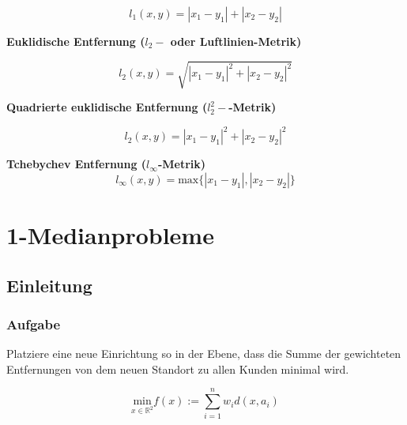     \begin{equation}
      l_1(x, y) = |x_1 - y_1| + |x_2 - y_2|
    \end{equation}

    \par \textbf{Euklidische Entfernung ($l_2-$ oder Luftlinien-Metrik)}

    \begin{equation}
      l_2(x, y) = \sqrt{|x_1 - y_1| ^ 2 + |x_2 - y_2| ^ 2}
    \end{equation}

    \par \textbf{Quadrierte euklidische Entfernung ($l_2^2-$-Metrik)}

    \begin{equation}
      l_2(x, y) = |x_1 - y_1| ^ 2 + |x_2 - y_2| ^ 2
    \end{equation}


    \par \textbf{Tchebychev Entfernung ($l_\infty$-Metrik)}
    \begin{equation}
      l_{\infty}(x, y) = \text{max}\{\left|x_1 - y_1\right|, \left|x_2 - y_2\right|\}
    \end{equation}
    


  \section{1-Medianprobleme} %
  \label{sec:1_medianprobleme}

    \subsection{Einleitung} %
    \label{sub:einleitung}

      \subsubsection{Aufgabe} %
      \label{ssub:aufgabe}
    
      \par Platziere eine neue Einrichtung so in der Ebene, dass die Summe der gewichteten Entfernungen von dem neuen Standort zu allen Kunden minimal wird.

      \begin{equation}
        \underset{x \in \mathbb{R}^2}{\text{min}} f(x) := \sum_{i = 1}^{n}w_id(x, a_i) 
      \end{equation}

